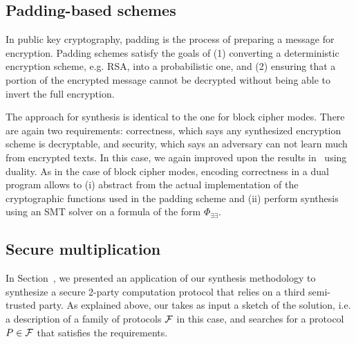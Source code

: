 \documentclass[preprint]{sig-alternate-05-2015}
\begin{document}
\subsection{Padding-based schemes}

In public key cryptography, padding is the process of preparing a
message for encryption.  %
Padding schemes %
satisfy the goals of (1) converting a deterministic
encryption scheme, e.g. RSA, into a probabilistic one, and (2)
ensuring that a portion of the encrypted message cannot be decrypted
without being able to invert the full encryption.


The approach for synthesis is identical to the one for block cipher modes.
There are again two requirements: 
correctness, which says any synthesized encryption scheme is decryptable,
and security, which says an adversary can not learn much from encrypted texts.
In this case, we again improved upon the results in~\cite{TGD15:CADE}
using duality. As in the case of
block cipher modes, encoding correctness in a dual program
allows to (i) abstract from the actual implementation of
the cryptographic functions used in the padding scheme and
(ii) perform synthesis using an SMT solver on a formula of the form $\Phi_{\exists\exists}$.


\subsection{Secure multiplication}
In Section~\label{sec:ex}, we presented an application
of our synthesis methodology to synthesize a secure 2-party
computation protocol that relies on a third semi-trusted
party. As explained above, our takes as input a sketch of the 
solution, i.e. a description of a family of protocols 
${\cal F}$ in this case, and searches for a protocol $P\in{\cal F}$
that satisfies the requirements. 
\end{document}
